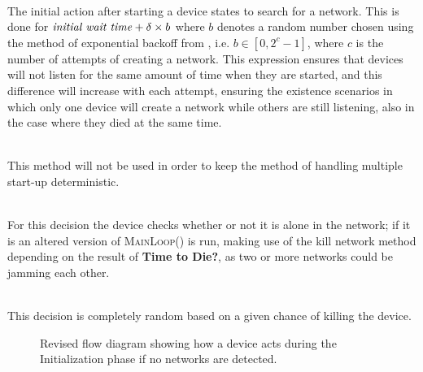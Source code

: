 \begin{description}[labelindent=\parindent]
    \item[Search for network]\hfill\\
    The initial action after starting a device states to search for a network.
    This is done for $\text{\textit{initial wait time}} + \delta \times b$ where $b$ denotes a random number chosen using the method of exponential backoff from , i.e. $b \in [0, 2^c-1]$, where $c$ is the number of attempts of creating a network.
    This expression ensures that devices will not listen for the same amount of time when they are started, and this difference will increase with each attempt, ensuring the existence scenarios in which only one device will create a network while others are still listening, also in the case where they died at the same time.
    \item[Chance of creating a network]\hfill\\
    This method will not be used in order to keep the method of handling multiple start-up deterministic.
    \item[Alone in network?]\hfill\\
    For this decision the device checks whether or not it is alone in the network; if it is an altered version of \textsc{MainLoop()} is run, making use of the kill network method depending on the result of \textbf{Time to Die?}, as two or more networks could be jamming each other.
    \item[Time to Die?]\hfill\\
    This decision is completely random based on a given chance of killing the device.
\end{description}

\begin{figure}[p]
\centering
\footnotesize

\vspace{-15pt}
\caption{Revised flow diagram showing how a device acts during the Initialization phase if no networks are detected.}
\label{fig:pseudo_flowMultiStart}
\vspace{-10pt}    
\end{figure}

